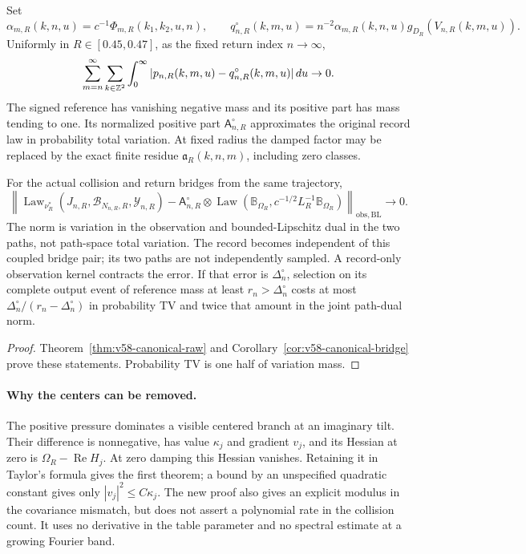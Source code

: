 \begin{leadtheorem}
\label{thm:intro-v58-record}
Set
\[
 \alpha_{m,R}(k,n,u)=c^{-1}\Phi_{m,R}(k_1,k_2,u,n),\qquad
 q^\circ_{n,R}(k,m,u)=n^{-2}\alpha_{m,R}(k,n,u)
                                        g_{D_R}(V_{n,R}(k,m,u)).
\]
Uniformly in $R\in[0.45,0.47]$, as the fixed return index $n\to\infty$,
\[
 \sum_{m=n}^\infty\sum_{k\in\mathbb Z^2}\int_0^\infty
                 |p_{n,R}(k,m,u)-q^\circ_{n,R}(k,m,u)|\,du\to0.
\]
The signed reference has vanishing negative mass and its positive
part has mass tending to one. Its normalized positive part
$\mathsf A^\circ_{n,R}$ approximates the original record law in
probability total variation. At fixed radius the damped factor may
be replaced by the exact finite residue $\mathfrak a_R(k,n,m)$,
including zero classes.

For the actual collision and return bridges from the same trajectory,
\[
 \left\|\operatorname{Law}_{\nu_R^*}
 (J_{n,R},\mathcal B_{N_{n,R},R},\mathcal Y_{n,R})
      -\mathsf A^\circ_{n,R}\otimes
       \operatorname{Law}(\mathbb B_{\Omega_R},
                    c^{-1/2}L_R^{-1}\mathbb B_{\Omega_R})
                       \right\|_{\mathrm{obs},\mathrm{BL}}\to0.
\]
The norm is variation in the observation and bounded-Lipschitz dual
in the two paths, not path-space total variation. The record becomes
independent of this coupled bridge pair; its two paths are not
independently sampled. A record-only observation kernel contracts the
error. If that error is $\Delta_n^\circ$, selection on its complete
output event of reference mass at least $r_n>\Delta_n^\circ$ costs
at most $\Delta_n^\circ/(r_n-\Delta_n^\circ)$ in probability TV and
twice that amount in the joint path-dual norm.
\end{leadtheorem}
\begin{proof}
Theorem~\ref{thm:v58-canonical-raw} and
Corollary~\ref{cor:v58-canonical-bridge} prove these statements.
Probability TV is one half of variation mass.
\end{proof}

\paragraph{Why the centers can be removed.}
The positive pressure dominates a visible centered branch at an
imaginary tilt. Their difference is nonnegative, has value $\kappa_j$
and gradient $v_j$, and its Hessian at zero is
$\Omega_R-\operatorname{Re}H_j$. At zero damping this Hessian
vanishes. Retaining it in Taylor's formula gives the first theorem;
a bound by an unspecified quadratic constant gives only
$|v_j|^2\le C\kappa_j$. The new proof also gives an explicit modulus
in the covariance mismatch, but does not assert a polynomial rate
in the collision count. It uses no derivative in the table parameter
and no spectral estimate at a growing Fourier band.


